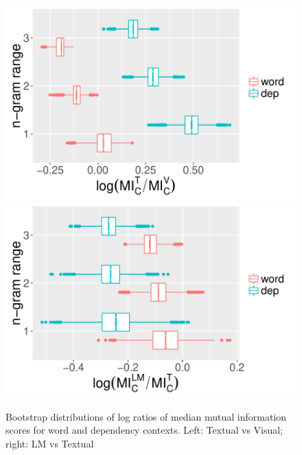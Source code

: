 \begin{figure}
  \centering
  \includegraphics[scale=0.4]{bootstrappedMI.pdf}
  \includegraphics[scale=0.4]{bootstrappedMI2.pdf}
  \caption{Bootstrap distributions of log ratios of median mutual
    information scores for word and dependency contexts. Left: {\sc Textual}
      vs {\sc Visual}; right: {\sc LM} vs {\sc Textual}}
  \label{fig:mi-boot}
  \vspace{-.2cm}
\end{figure}



